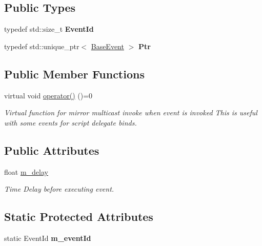 \subsection*{Public Types}
\begin{DoxyCompactItemize}
\item 
\mbox{\label{classBaseEvent_a67cfea4f5876d7644ffe71c460b77e62}} 
typedef std\+::size\+\_\+t {\bfseries Event\+Id}
\item 
\mbox{\label{classBaseEvent_adcd2734dcd54d458c8a6a2cbdac14d19}} 
typedef std\+::unique\+\_\+ptr$<$ \hyperlink{classBaseEvent}{Base\+Event} $>$ {\bfseries Ptr}
\end{DoxyCompactItemize}
\subsection*{Public Member Functions}
\begin{DoxyCompactItemize}
\item 
\mbox{\label{classBaseEvent_afa6860ba23bb43a7e158d238939c265f}} 
virtual void \hyperlink{classBaseEvent_afa6860ba23bb43a7e158d238939c265f}{operator()} ()=0
\begin{DoxyCompactList}\small\item\em Virtual function for mirror multicast invoke when event is invoked This is useful with some events for script delegate binds. \end{DoxyCompactList}\end{DoxyCompactItemize}
\subsection*{Public Attributes}
\begin{DoxyCompactItemize}
\item 
\mbox{\label{classBaseEvent_afb79121ea0c7c6de301353e5e2fe3a34}} 
float \hyperlink{classBaseEvent_afb79121ea0c7c6de301353e5e2fe3a34}{m\+\_\+delay}
\begin{DoxyCompactList}\small\item\em Time Delay before executing event. \end{DoxyCompactList}\end{DoxyCompactItemize}
\subsection*{Static Protected Attributes}
\begin{DoxyCompactItemize}
\item 
\mbox{\label{classBaseEvent_a4e5bcc9ddaf500a7093357a00be5aa02}} 
static Event\+Id {\bfseries m\+\_\+event\+Id}
\end{DoxyCompactItemize}
